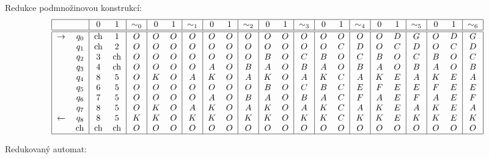 Redukce podmnožinovou konstrukcí: 
\[
\begin{tabular}{|r r|c c|c|c c|c|c c|c|c c|c|c c|c|c c|c|c c| c|}
    \hline
    & & $0$ & $1$ & $\sim_0$ & $0$ & $1$ & $\sim_1$ & $0$ & $1$ & $\sim_2$ & $0$ & $1$ & $\sim_3$ & $0$ & $1$ & $\sim_4$ & $0$ & $1$ & $\sim_5$ & $0$ & $1$ & $\sim_6$\\
    \hline
    \hline
    $\rightarrow$ & $q_0$ & ch &$1$ &$O$ &$O$ &$O$ &$O$ &$O$ &$O$ &$O$ &$O$ &$O$ &$O$ &$O$ &$O$ &$O$ &$O$ &$D$ &$G$ &$O$ &$D$ &$G$\\
              & $q_1$ & ch &$2$ &$O$ &$O$ &$O$ &$O$ &$O$ &$O$ &$O$ &$O$ &$O$ &$O$ &$O$ &$C$ &$D$ &$O$ &$C$ &$D$ &$O$ &$C$ &$D$\\
              & $q_2$ &$3$ & ch &$O$ &$O$ &$O$ &$O$ &$O$ &$O$ &$O$ &$B$ &$O$ &$C$ &$B$ &$O$ &$C$ &$B$ &$O$ &$C$ &$B$ &$O$ &$C$\\
              & $q_3$ &$4$ & ch &$O$ &$O$ &$O$ &$O$ &$A$ &$O$ &$B$ &$A$ &$O$ &$B$ &$A$ &$O$ &$B$ &$A$ &$O$ &$B$ &$A$ &$O$ &$B$\\
              & $q_4$ &$8$ &$5$ &$O$ &$K$ &$O$ &$A$ &$K$ &$O$ &$A$ &$K$ &$O$ &$A$ &$K$ &$C$ &$A$ &$K$ &$E$ &$A$ &$K$ &$E$ &$A$\\
              & $q_5$ &$6$ &$5$ &$O$ &$O$ &$O$ &$O$ &$O$ &$O$ &$O$ &$B$ &$O$ &$C$ &$B$ &$C$ &$E$ &$F$ &$E$ &$E$ &$F$ &$E$ &$E$\\
              & $q_6$ &$7$ &$5$ &$O$ &$O$ &$O$ &$O$ &$A$ &$O$ &$B$ &$A$ &$O$ &$B$ &$A$ &$C$ &$F$ &$A$ &$E$ &$F$ &$A$ &$E$ &$F$\\
              & $q_7$ &$8$ &$5$ &$O$ &$K$ &$O$ &$A$ &$K$ &$O$ &$A$ &$K$ &$O$ &$A$ &$K$ &$C$ &$A$ &$K$ &$E$ &$A$ &$K$ &$E$ &$A$\\
    $\leftarrow$  & $q_8$ &$8$ &$5$ &$K$ &$K$ &$O$ &$K$ &$K$ &$O$ &$K$ &$K$ &$O$ &$K$ &$K$ &$C$ &$K$ &$K$ &$E$ &$K$ &$K$ &$E$ &$K$\\
              &  ch   & ch & ch &$O$ &$O$ &$O$ &$O$ &$O$ &$O$ &$O$ &$O$ &$O$ &$O$ &$O$ &$O$ &$O$ &$O$ &$O$ &$O$ &$O$ &$O$ &$O$\\
    \hline
\end{tabular}
\]

Redukovaný automat: 

